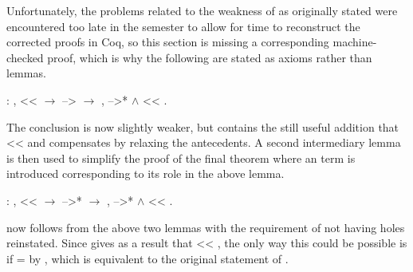\documentclass[12pt]{report}
\begin{document}
Unfortunately, the problems related to the weakness of
 as originally stated were
encountered too late in the semester to allow for time to reconstruct
the corrected proofs in Coq, so this section is missing
a corresponding machine-checked proof, which is why the following are
stated as axioms rather than lemmas.



\begin{coqdoccode}
\coqdocemptyline
\coqdocemptyline
\coqdocindent{1.00em}
  : \coqdockw{\ensuremath{\forall}}   ,\coqdoceol
\coqdocindent{2.00em}
 <<  \ensuremath{\rightarrow}\coqdoceol
\coqdocindent{2.00em}
 -->  \ensuremath{\rightarrow}\coqdoceol
\coqdocindent{2.00em}
\coqdoctac{\ensuremath{\exists}} ,  -->*  \ensuremath{\land}  << .\coqdoceol
\coqdocemptyline
\end{coqdoccode}

The conclusion is now slightly weaker, but contains the still useful
addition that  <<  and compensates by
relaxing the antecedents. A second intermediary lemma is then used to
simplify the proof of the final  theorem
where an  term is introduced corresponding to its role
in the above lemma.

\begin{coqdoccode}
\coqdocemptyline
\coqdocindent{1.00em}
  : \coqdockw{\ensuremath{\forall}}   ,\coqdoceol
\coqdocindent{2.00em}
 <<  \ensuremath{\rightarrow}\coqdoceol
\coqdocindent{2.00em}
 -->*  \ensuremath{\rightarrow}\coqdoceol
\coqdocindent{2.00em}
\coqdoctac{\ensuremath{\exists}} ,  -->*  \ensuremath{\land}  << .\coqdoceol
\coqdocemptyline
\end{coqdoccode}

 now follows from the above two lemmas with
the requirement of  not having holes reinstated. Since
 gives as a result that  <<
, the only way this could be possible is if
 =  by
, which is equivalent to the
original statement of . 
\end{document}
